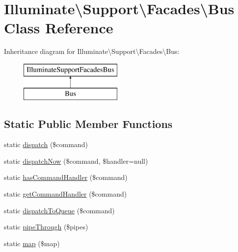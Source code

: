 \hypertarget{class_illuminate_1_1_support_1_1_facades_1_1_bus}{}\section{Illuminate\textbackslash{}Support\textbackslash{}Facades\textbackslash{}Bus Class Reference}
\label{class_illuminate_1_1_support_1_1_facades_1_1_bus}
Inheritance diagram for Illuminate\textbackslash{}Support\textbackslash{}Facades\textbackslash{}Bus\+:\begin{figure}[H]
\begin{center}
\leavevmode
\includegraphics[height=2.000000cm]{class_illuminate_1_1_support_1_1_facades_1_1_bus}
\end{center}
\end{figure}
\subsection*{Static Public Member Functions}
\begin{DoxyCompactItemize}
\item 
static \mbox{\hyperlink{class_illuminate_1_1_support_1_1_facades_1_1_bus_af590935cb141b08cecb4a2e3222f9ce9}{dispatch}} (\$command)
\item 
static \mbox{\hyperlink{class_illuminate_1_1_support_1_1_facades_1_1_bus_a235f374bf88ac804ee020ae351f3ed0e}{dispatch\+Now}} (\$command, \$handler=null)
\item 
static \mbox{\hyperlink{class_illuminate_1_1_support_1_1_facades_1_1_bus_a9ce6c02e0ce39585a360f85c34c4bc42}{has\+Command\+Handler}} (\$command)
\item 
static \mbox{\hyperlink{class_illuminate_1_1_support_1_1_facades_1_1_bus_a4022c67963c0e29af464d885698d2c66}{get\+Command\+Handler}} (\$command)
\item 
static \mbox{\hyperlink{class_illuminate_1_1_support_1_1_facades_1_1_bus_a3975eb2e49eabbe74a6c784eb076c925}{dispatch\+To\+Queue}} (\$command)
\item 
static \mbox{\hyperlink{class_illuminate_1_1_support_1_1_facades_1_1_bus_ad04e2fde658dcbb3e583365f665c7381}{pipe\+Through}} (\$pipes)
\item 
static \mbox{\hyperlink{class_illuminate_1_1_support_1_1_facades_1_1_bus_a944bb1fc82a5d13749d20d31b1da9a9a}{map}} (\$map)
\end{DoxyCompactItemize}


